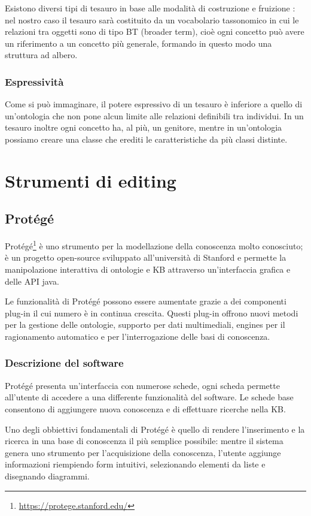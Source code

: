 Esistono diversi tipi di tesauro in base alle modalità di costruzione e fruizione \cite{kilgarriff2000s}: nel nostro caso il tesauro sarà costituito da un vocabolario tassonomico in cui le relazioni tra oggetti sono di tipo BT (broader term), cioè ogni concetto può avere un riferimento a un concetto più generale, formando in questo modo una struttura ad albero. 
\subsubsection{Espressività}
Come si può immaginare, il potere espressivo di un tesauro è inferiore a quello di un'ontologia che non pone alcun limite alle relazioni definibili tra individui. In un tesauro inoltre ogni concetto ha, al più, un genitore, mentre in un'ontologia possiamo creare una classe che erediti le caratteristiche da più classi distinte.
\section{Strumenti di editing}

\subsection{Protégé}
Protégé\footnote{\url{https://protege.stanford.edu/}} è uno strumento per la modellazione della conoscenza molto conosciuto; è un progetto open-source sviluppato all'università di Stanford e permette la manipolazione interattiva di ontologie e KB attraverso un'interfaccia grafica e delle API java.

Le funzionalità di Protégé possono essere aumentate grazie a dei componenti plug-in il cui numero è in continua crescita. Questi plug-in offrono nuovi metodi per la gestione delle ontologie, supporto per dati multimediali, engines per il ragionamento automatico e per l'interrogazione delle basi di conoscenza\cite{sivakumar2011ontology}.
\subsubsection{Descrizione del software}
Protégé presenta un'interfaccia con numerose schede, ogni scheda permette all'utente di accedere a una differente funzionalità del software. Le schede base consentono di aggiungere nuova conoscenza e di effettuare ricerche nella KB.

Uno degli obbiettivi fondamentali di Protégé è quello di rendere l'inserimento e la ricerca in una base di conoscenza il più semplice possibile: mentre il sistema genera uno strumento per l'acquisizione della conoscenza, l'utente aggiunge informazioni riempiendo form intuitivi, selezionando elementi da liste e disegnando diagrammi.

